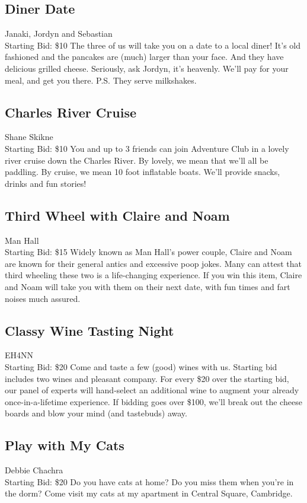 \documentclass[11pt]{article}
\begin{document}
\subsection{Diner Date}
Janaki, Jordyn and Sebastian
\\
Starting Bid: \$10
\newline
The three of us will take you on a date to a local diner! It's old fashioned and the pancakes are (much) larger than your face. And they have delicious grilled cheese. Seriously, ask Jordyn, it's heavenly. We'll pay for your meal, and get you there. P.S. They serve milkshakes.
\subsection{Charles River Cruise}
Shane Skikne
\\
Starting Bid: \$10
\newline
You and up to 3 friends can join Adventure Club in a lovely river cruise down the Charles River. By lovely, we mean that we'll all be paddling. By cruise, we mean 10 foot inflatable boats. We'll provide snacks, drinks and fun stories!
\subsection{Third Wheel with Claire and Noam}
Man Hall
\\
Starting Bid: \$15
\newline
Widely known as Man Hall's power couple, Claire and Noam are known for their general antics and excessive poop jokes. Many can attest that third wheeling these two is a life-changing experience. If you win this item, Claire and Noam will take you with them on their next date, with fun times and fart noises much assured.
\subsection{Classy Wine Tasting Night}
EH4NN
\\
Starting Bid: \$20
\newline
Come and taste a few (good) wines with us. Starting bid includes two wines and pleasant company. For every \$20 over the starting bid, our panel of experts will hand-select an additional wine to augment your already once-in-a-lifetime experience. If bidding goes over \$100, we'll break out the cheese boards and blow your mind (and tastebuds) away.
\subsection{Play with My Cats}
Debbie Chachra
\\
Starting Bid: \$20
\newline
Do you have cats at home? Do you miss them when you're in the dorm? Come visit my cats at my apartment in Central Square, Cambridge.
\end{document}
